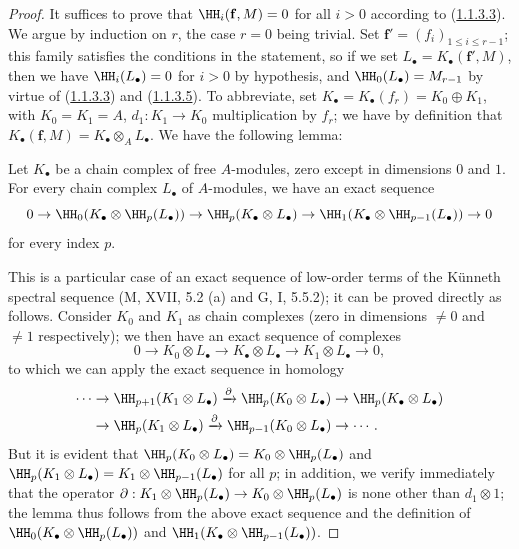 \begin{proof}
It suffices to prove that $\HH_i(\mathbf{f},M)=0$ for all $i>0$ according to (\hyperref[III.1.1.3.3]{1.1.3.3}).
We argue by induction on $r$, the case $r=0$ being trivial.
Set $\mathbf{f}'=(f_i)_{1\leq i\leq r-1}$; this family satisfies the conditions in the statement, so if we set $L_\bullet=K_\bullet(\mathbf{f}',M)$, then we have $\HH_i(L_\bullet)=0$ for $i>0$ by hypothesis, and $\HH_0(L_\bullet)=M_{r-1}$ by virtue of (\hyperref[III.1.1.3.3]{1.1.3.3}) and (\hyperref[III.1.1.3.5]{1.1.3.5}).
To abbreviate, set $K_\bullet=K_\bullet(f_r)=K_0\oplus K_1$, with $K_0=K_1=A$, $d_1:K_1\to K_0$ multiplication by $f_r$; we have by definition  that $K_\bullet(\mathbf{f},M)=K_\bullet\otimes_A L_\bullet$.
We have the following lemma:

\begin{lemma}[1.1.4.1]
\label{III.1.1.4.1}
Let $K_\bullet$ be a chain complex of free $A$-modules, zero except in dimensions $0$ and $1$.
For every chain complex $L_\bullet$ of $A$-modules, we have an exact sequence
\[
  0\to\HH_0(K_\bullet\otimes\HH_p(L_\bullet))\to\HH_p(K_\bullet\otimes L_\bullet)\to\HH_1(K_\bullet\otimes\HH_{p-1}(L_\bullet))\to 0
\]
for every index $p$.
\end{lemma}

This is a particular case of an exact sequence of low-order terms of the K\"unneth spectral sequence (M, XVII, 5.2 (a) and G, I, 5.5.2); it can be proved directly as follows.
Consider $K_0$ and $K_1$ as chain complexes (zero in dimensions $\neq 0$ and $\neq 1$ respectively); we then have an exact sequence of complexes
\[
  0\to K_0\otimes L_\bullet\to K_\bullet\otimes L_\bullet\to K_1\otimes L_\bullet\to 0,
\]
to which we can apply the exact sequence in homology
\[
  \begin{aligned}
  \cdots&\to\HH_{p+1}(K_1\otimes L_\bullet)
  \xrightarrow{\partial}\HH_p(K_0\otimes L_\bullet)
  \to\HH_p(K_\bullet\otimes L_\bullet)\\
  &\to\HH_p(K_1\otimes L_\bullet)
  \xrightarrow{\partial}\HH_{p-1}(K_0\otimes L_\bullet)\to\cdots.
  \end{aligned}
\]
But it is evident that $\HH_p(K_0\otimes L_\bullet)=K_0\otimes\HH_p(L_\bullet)$ and $\HH_p(K_1\otimes L_\bullet)=K_1\otimes\HH_{p-1}(L_\bullet)$ for all $p$; in addition, we verify immediately that the operator $\partial:K_1\otimes\HH_p(L_\bullet)\to K_0\otimes\HH_p(L_\bullet)$ is none other than $d_1\otimes 1$; the lemma thus follows from the above exact sequence and the definition of $\HH_0(K_\bullet\otimes\HH_p(L_\bullet))$ and $\HH_1(K_\bullet\otimes\HH_{p-1}(L_\bullet))$.


\end{proof}
